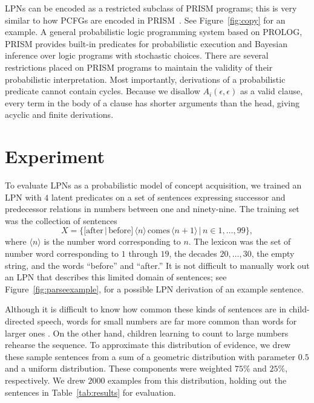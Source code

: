 \documentclass[10pt, twocolumn]{article}
\begin{document}
LPNs can be encoded as a restricted subclass of PRISM programs; this
is very similar to how PCFGs are encoded in
PRISM~\cite{DBLP:conf/cl/2000}. See Figure~\ref{fig:copy} for an
example. A general probabilistic logic programming system based on
PROLOG, PRISM provides built-in predicates for probabilistic execution
and Bayesian inference over logic programs with stochastic
choices. There are several restrictions placed on PRISM programs to
maintain the validity of their probabilistic interpretation. Most
importantly, derivations of a probabilistic predicate cannot contain
cycles. Because we disallow $A_i(\epsilon,\epsilon)$ as a valid
clause, every term in the body of a clause has shorter arguments than
the head, giving acyclic and finite derivations.


\section{Experiment}

To evaluate LPNs as a probabilistic model of concept acquisition, we
trained an LPN with $4$ latent predicates on a set of sentences
expressing successor and predecessor relations in numbers between one
and ninety-nine. The training set was the collection of sentences $$X
= \{[\text{after}\, | \, \text{before}] \, \langle n \rangle \,
\text{comes} \, \langle n+1 \rangle \,|\, n \in 1,\dots,99\},$$ where
$\langle n \rangle$ is the number word corresponding to $n$. The
lexicon was the set of number word corresponding to $1$ through $19$,
the decades $20, \dots, 30$, the empty string, and the words
``before'' and ``after.'' It is not difficult to manually work out an
LPN that describes this limited domain of sentences; see
Figure~\ref{fig:parseexample}, for a possible LPN derivation of an
example sentence.

Although it is difficult to know how common these kinds of sentences
are in child-directed speech, words for small numbers are far more
common than words for larger ones \cite{macwhinney2000childes}. On the
other hand, children learning to count to large numbers rehearse the
sequence. To approximate this distribution of evidence, we drew these
sample sentences from a sum of a geometric distribution with parameter
$0.5$ and a uniform distribution. These components were weighted
$75\%$ and $25\%$, respectively. We drew $2000$ examples from this
distribution, holding out the sentences in Table~\ref{tab:results} for
evaluation.
\end{document}
